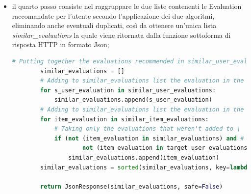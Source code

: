 \begin{itemize}
\begin{lstlisting}[language=Python, label=lst:CF_Hybrid_Evaluation_4]
                # Taking only the evaluations that have: different other_id (excluding the target evaluation
                # in the recommendation) and same parent_id and the evaluations that weren't added to 'similar_item_evaluations'
                # list or to 'similar_user_evaluations' or to 'target_user_evaluations'
                if ((t_user_evaluation['other_id'] != item_evaluation['other_id']) and # Evaluations must have different 'id'
                        (t_user_evaluation['parent_id'] == item_evaluation['parent_id']) and # Evaluations must have the same 'parent_id'
                        # Evaluation in all_other_evals list mustn't be already added to \
                        not (item_evaluation in similar_item_evaluations) and # the 'similar_item_evaluations' list,
                        not (item_evaluation in similar_user_evaluations) and # the 'similar_user_evaluations' list or
                        not (item_evaluation in target_user_evaluations)): # the 'target_user_evaluations' list
                    similar_item_evaluations.append(item_evaluation)
    \end{lstlisting} 
    \item il quarto passo consiste nel raggruppare le due liste contenenti le Evaluation raccomandate per l'utente secondo l'applicazione dei 
    due algoritmi, eliminando anche eventuali duplicati, così da ottenere un'unica lista \textit{similar\_evaluations} la quale viene ritornata dalla 
    funzione sottoforma di risposta HTTP in formato Json;
    \begin{lstlisting}[language=Python, label=lst:CF_Hybrid_Evaluation_5]
        # Putting together the evaluations recommended in similar_user_evaluations list and similar_item_evaluations list
        similar_evaluations = []
        # Adding to similar_evaluations list the evaluation in the similar_user_evaluations list
        for s_user_evaluation in similar_user_evaluations:
            similar_evaluations.append(s_user_evaluation)
        # Adding to similar_evaluations list the evaluation in the similar_item_evaluations list
        for item_evaluation in similar_item_evaluations:
            # Taking only the evaluations that weren't added to \
            if (not (item_evaluation in similar_evaluations) and # the 'similar_evaluations' list or
                    not (item_evaluation in target_user_evaluations)): # the 'target_user_evaluations' list
                similar_evaluations.append(item_evaluation)
        similar_evaluations = sorted(similar_evaluations, key=lambda i: i['other_id'])
        
        return JsonResponse(similar_evaluations, safe=False)
    \end{lstlisting} 
\end{itemize}
